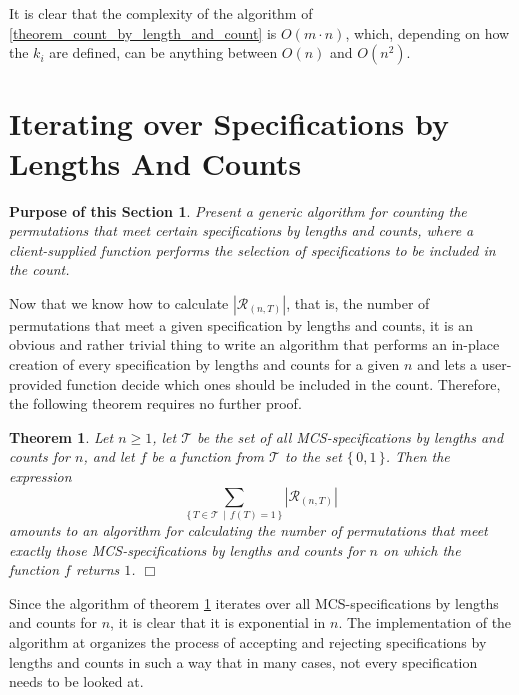 \documentclass{article}
\newtheorem{theorem}{Theorem}[section]
\newtheorem{purpose}{Purpose of this Section}
\def\endproof{\mbox{$\Box$} \par }     %
\begin{document}
It is clear that the complexity of the algorithm of \ref{theorem_count_by_length_and_count}
is $O(m\cdot n)$, which, depending on how the $k_i$ are defined, can be anything between
$O(n)$ and $O(n^2)$.

\section{Iterating over Specifications by Lengths And Counts}

\begin{purpose}
  Present a generic algorithm for counting the permutations that meet certain specifications
  by lengths and counts, where a client-supplied function performs the selection of
  specifications to be included in the count.
\end{purpose}

Now that we know how to calculate $|{\mathcal R}_{(n,T)}|$, that is, the number of permutations that
meet a given specification by lengths and counts, it is an obvious and rather trivial thing to write
an algorithm that performs an in-place creation of every specification by lengths and counts for a
given $n$ and lets a user-provided function decide which ones should be included in the count.
Therefore, the following theorem requires no further proof.

\begin{theorem}\label{theorem_iterating_over_specs_by_count_by_length_and_count}
  Let $n \geq 1$, let ${\mathcal T}$ be the set of all MCS-specifications by
  lengths and counts for $n$, and let $f$ be a function from ${\mathcal T}$ to the set $\{\, 0, 1\,\}$.
  Then the expression
  $$
  \sum_{\{\,T \in{\mathcal T}\,\mid\, f(T) = 1\,\}}|{\mathcal R}_{(n,T)}|
  $$
  amounts to an algorithm for calculating the number of permutations that meet exactly
  those MCS-specifications by lengths and counts for $n$ on which the function $f$ returns $1$.
  \endproof
\end{theorem}

Since the algorithm of theorem \ref{theorem_iterating_over_specs_by_count_by_length_and_count} iterates over all
MCS-specifications by lengths and counts for $n$, it is clear that it is exponential in $n$. The
implementation of the algorithm at \cite{algos} organizes the process of accepting and rejecting
specifications by lengths and counts in such a way that in many cases, not every specification needs
to be looked at.
\end{document}
